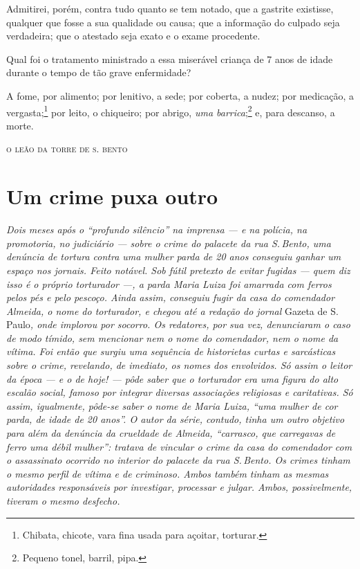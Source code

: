 {Admitirei, porém, contra tudo quanto se tem notado, que a gastrite
existisse, qualquer que fosse a sua qualidade ou causa; que a informação
do culpado seja verdadeira; que o atestado seja exato e o exame
procedente.

Qual foi o tratamento ministrado a essa miserável criança de 7 anos de
idade durante o tempo de tão grave enfermidade?

A fome, por alimento; por lenitivo, a sede; por coberta, a nudez; por
medicação, a vergasta;\footnote{Chibata, chicote, vara fina usada para
  açoitar, torturar.} por leito, o chiqueiro; por abrigo, \emph{uma
barrica};\footnote{Pequeno tonel, barril, pipa.} e, para descanso, a morte.

\medskip
\hfill\textsc{o leão da torre de s. bento}

\part{Um crime puxa outro}

\begin{didas}
\emph{Dois meses após o ``profundo silêncio'' na imprensa --- e na polícia,
na promotoria, no judiciário --- sobre o crime do palacete da rua S.\,Bento,
uma denúncia de tortura contra uma mulher parda de 20 anos
conseguiu ganhar um espaço nos jornais. Feito notável. Sob fútil
pretexto de evitar fugidas --- quem diz isso é o próprio torturador ---, a
parda Maria Luiza foi amarrada com ferros pelos pés e pelo pescoço.
Ainda assim, conseguiu fugir da casa do comendador Almeida, o nome do
torturador, e chegou até a redação do jornal} Gazeta de S.\,Paulo\emph{,
onde implorou por socorro. Os redatores, por sua vez, denunciaram o caso
de modo tímido, sem mencionar nem o nome do comendador, nem o nome da
vítima. Foi então que surgiu uma sequência de historietas curtas e
sarcásticas sobre o crime, revelando, de imediato, os nomes dos
envolvidos. Só assim o leitor da época --- e o de hoje! --- pôde saber que
o torturador era uma figura do alto escalão social, famoso por integrar
diversas associações religiosas e caritativas. Só assim, igualmente,
pôde-se saber o nome de Maria Luiza, ``uma mulher de cor parda, de idade
de 20 anos''. O autor da série, contudo, tinha um outro objetivo para
além da denúncia da crueldade de Almeida, ``carrasco, que carregavas de
ferro uma débil mulher'': tratava de vincular o crime da casa do
comendador com o assassinato ocorrido no interior do palacete da rua S.\,Bento. Os crimes tinham o mesmo perfil de vítima e de criminoso. Ambos
também tinham as mesmas autoridades responsáveis por investigar,
processar e julgar. Ambos, possivelmente, tiveram o mesmo desfecho. }
\end{didas}

}
